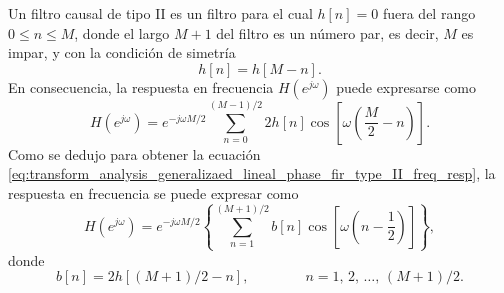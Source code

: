 \documentclass[a4paper]{report}
\begin{document}
Un filtro causal de tipo II es un filtro para el cual \(h[n]=0\) fuera del rango \(0\leq n\leq M\), donde el largo \(M+1\) del filtro es un número par, es decir, \(M\) es impar, y con la condición de simetría
\[
 h[n]=h[M-n].
\]
En consecuencia, la respuesta en frecuencia \(H(e^{j\omega})\) puede expresarse como
\[
 H(e^{j\omega})=e^{-j\omega M/2}\sum_{n=0}^{(M-1)/2}2h[n]\cos\left[\omega\left(\frac{M}{2}-n\right)\right].
\]
Como se dedujo para obtener la ecuación \ref{eq:transform_analysis_generalizaed_lineal_phase_fir_type_II_freq_resp}, la respuesta en frecuencia se puede expresar como
\begin{equation}\label{eq:filter_design_fir_optimal_type_II_freq_response}
 H(e^{j\omega})=e^{-j\omega M/2}\left\{\sum_{n=1}^{(M+1)/2}b[n]\cos\left[\omega\left(n-\frac{1}{2}\right)\right]\right\},  
\end{equation}
donde
\[
 b[n]=2h[(M+1)/2-n],
 \qquad\qquad 
 n=1,\,2,\,\dots,\,(M+1)/2.
\]
\end{document}
